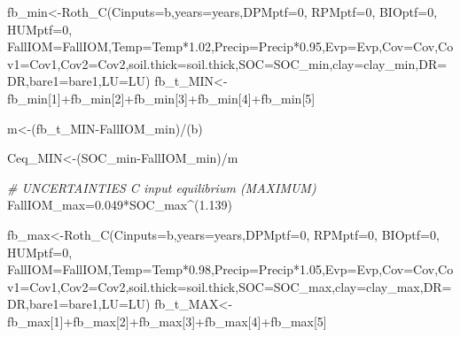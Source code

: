 \documentclass[
  10pt,
  b5paper,
]{book}
\newenvironment{Shaded}{\begin{snugshade}}{\end{snugshade}}
\newcommand{\AttributeTok}[1]{\textcolor[rgb]{0.77,0.63,0.00}{#1}}
\newcommand{\CommentTok}[1]{\textcolor[rgb]{0.56,0.35,0.01}{\textit{#1}}}
\newcommand{\DecValTok}[1]{\textcolor[rgb]{0.00,0.00,0.81}{#1}}
\newcommand{\FloatTok}[1]{\textcolor[rgb]{0.00,0.00,0.81}{#1}}
\newcommand{\FunctionTok}[1]{\textcolor[rgb]{0.00,0.00,0.00}{#1}}
\newcommand{\NormalTok}[1]{#1}
\newcommand{\OtherTok}[1]{\textcolor[rgb]{0.56,0.35,0.01}{#1}}
\newcommand{\SpecialCharTok}[1]{\textcolor[rgb]{0.00,0.00,0.00}{#1}}
\begin{document}
\begin{Shaded}
\begin{Highlighting}[]
\NormalTok{fb\_min}\OtherTok{\textless{}{-}}\FunctionTok{Roth\_C}\NormalTok{(}\AttributeTok{Cinputs=}\NormalTok{b,}\AttributeTok{years=}\NormalTok{years,}\AttributeTok{DPMptf=}\DecValTok{0}\NormalTok{, }\AttributeTok{RPMptf=}\DecValTok{0}\NormalTok{, }\AttributeTok{BIOptf=}\DecValTok{0}\NormalTok{, }\AttributeTok{HUMptf=}\DecValTok{0}\NormalTok{, }\AttributeTok{FallIOM=}\NormalTok{FallIOM,}\AttributeTok{Temp=}\NormalTok{Temp}\SpecialCharTok{*}\FloatTok{1.02}\NormalTok{,}\AttributeTok{Precip=}\NormalTok{Precip}\SpecialCharTok{*}\FloatTok{0.95}\NormalTok{,}\AttributeTok{Evp=}\NormalTok{Evp,}\AttributeTok{Cov=}\NormalTok{Cov,}\AttributeTok{Cov1=}\NormalTok{Cov1,}\AttributeTok{Cov2=}\NormalTok{Cov2,}\AttributeTok{soil.thick=}\NormalTok{soil.thick,}\AttributeTok{SOC=}\NormalTok{SOC\_min,}\AttributeTok{clay=}\NormalTok{clay\_min,}\AttributeTok{DR=}\NormalTok{DR,}\AttributeTok{bare1=}\NormalTok{bare1,}\AttributeTok{LU=}\NormalTok{LU)}
\NormalTok{fb\_t\_MIN}\OtherTok{\textless{}{-}}\NormalTok{fb\_min[}\DecValTok{1}\NormalTok{]}\SpecialCharTok{+}\NormalTok{fb\_min[}\DecValTok{2}\NormalTok{]}\SpecialCharTok{+}\NormalTok{fb\_min[}\DecValTok{3}\NormalTok{]}\SpecialCharTok{+}\NormalTok{fb\_min[}\DecValTok{4}\NormalTok{]}\SpecialCharTok{+}\NormalTok{fb\_min[}\DecValTok{5}\NormalTok{]}

\NormalTok{m}\OtherTok{\textless{}{-}}\NormalTok{(fb\_t\_MIN}\SpecialCharTok{{-}}\NormalTok{FallIOM\_min)}\SpecialCharTok{/}\NormalTok{(b)}

\NormalTok{Ceq\_MIN}\OtherTok{\textless{}{-}}\NormalTok{(SOC\_min}\SpecialCharTok{{-}}\NormalTok{FallIOM\_min)}\SpecialCharTok{/}\NormalTok{m}

\CommentTok{\# UNCERTAINTIES C input equilibrium (MAXIMUM)}
\NormalTok{FallIOM\_max}\OtherTok{=}\FloatTok{0.049}\SpecialCharTok{*}\NormalTok{SOC\_max}\SpecialCharTok{\^{}}\NormalTok{(}\FloatTok{1.139}\NormalTok{) }

\NormalTok{fb\_max}\OtherTok{\textless{}{-}}\FunctionTok{Roth\_C}\NormalTok{(}\AttributeTok{Cinputs=}\NormalTok{b,}\AttributeTok{years=}\NormalTok{years,}\AttributeTok{DPMptf=}\DecValTok{0}\NormalTok{, }\AttributeTok{RPMptf=}\DecValTok{0}\NormalTok{, }\AttributeTok{BIOptf=}\DecValTok{0}\NormalTok{, }\AttributeTok{HUMptf=}\DecValTok{0}\NormalTok{, }\AttributeTok{FallIOM=}\NormalTok{FallIOM,}\AttributeTok{Temp=}\NormalTok{Temp}\SpecialCharTok{*}\FloatTok{0.98}\NormalTok{,}\AttributeTok{Precip=}\NormalTok{Precip}\SpecialCharTok{*}\FloatTok{1.05}\NormalTok{,}\AttributeTok{Evp=}\NormalTok{Evp,}\AttributeTok{Cov=}\NormalTok{Cov,}\AttributeTok{Cov1=}\NormalTok{Cov1,}\AttributeTok{Cov2=}\NormalTok{Cov2,}\AttributeTok{soil.thick=}\NormalTok{soil.thick,}\AttributeTok{SOC=}\NormalTok{SOC\_max,}\AttributeTok{clay=}\NormalTok{clay\_max,}\AttributeTok{DR=}\NormalTok{DR,}\AttributeTok{bare1=}\NormalTok{bare1,}\AttributeTok{LU=}\NormalTok{LU)}
\NormalTok{fb\_t\_MAX}\OtherTok{\textless{}{-}}\NormalTok{fb\_max[}\DecValTok{1}\NormalTok{]}\SpecialCharTok{+}\NormalTok{fb\_max[}\DecValTok{2}\NormalTok{]}\SpecialCharTok{+}\NormalTok{fb\_max[}\DecValTok{3}\NormalTok{]}\SpecialCharTok{+}\NormalTok{fb\_max[}\DecValTok{4}\NormalTok{]}\SpecialCharTok{+}\NormalTok{fb\_max[}\DecValTok{5}\NormalTok{]}


\end{Highlighting}
\end{Shaded}
\end{document}
